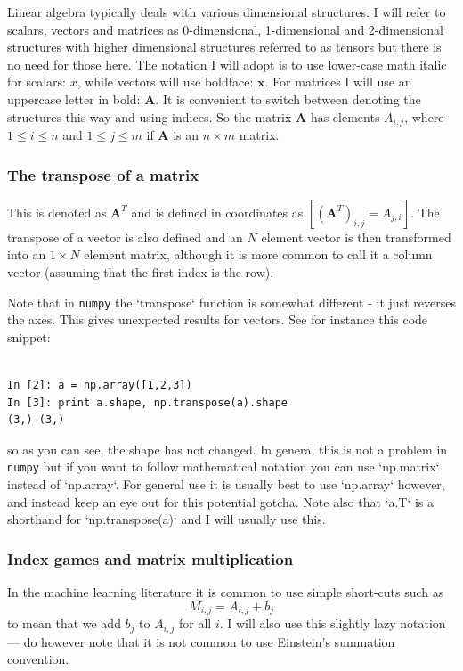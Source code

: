 \documentclass[a4paper,10pt]{article}
\begin{document}
Linear algebra typically deals with various dimensional structures. I will refer to scalars, vectors and matrices as 0-dimensional, 1-dimensional and 2-dimensional structures with higher dimensional structures referred to as tensors but there is no need for those here. The notation I will adopt is to use lower-case math italic for scalars: $x$, while vectors will use boldface: $\mathbf{x}$. For matrices I will use an uppercase letter in bold: $\mathbf{A}$. It is convenient to switch between denoting the structures this way and using indices. So the matrix $\mathbf{A}$ has elements $A_{i, j}$, where $1\le i\le n$ and $1 \le j \le m$ if $\mathbf{A}$ is an $n\times m$ matrix. 
 
\subsubsection{ The transpose of a matrix}

This is denoted as $\mathbf{A}^T$ and is defined in coordinates as $ [ \left(\mathbf{A}^{T}\right)_{i, j} = {A}_{j, i} ] $. The transpose of a vector is also defined and an $N$ element vector is then transformed into an $1\times N$ element matrix, although it is more common to call it a column vector (assuming that the first index is the row).

Note that in \texttt{numpy} the `transpose` function is somewhat different - it just reverses the axes. This gives unexpected results for vectors. See for instance this code snippet:
\begin{lstlisting}

In [2]: a = np.array([1,2,3])
In [3]: print a.shape, np.transpose(a).shape
(3,) (3,)
\end{lstlisting}

so as you can see, the shape has not changed. In general this is not a problem in \texttt{numpy} but if you want to follow mathematical notation you can use `np.matrix` instead of `np.array`. For general use it is usually best to use `np.array` however, and instead keep an eye out for this potential gotcha.  Note also that `a.T` is a shorthand for `np.transpose(a)` and I will usually use this.


\subsubsection{ Index games and matrix multiplication}

In the machine learning literature it is common to use simple short-cuts such as
$$M_{i,j} = A_{i,j} + b_{j}$$
to mean that we add $b_j$ to $A_{i,j}$ for all $i$. I will also use this slightly lazy notation --- do however note that it is not common to use Einstein's summation convention.
\end{document}
